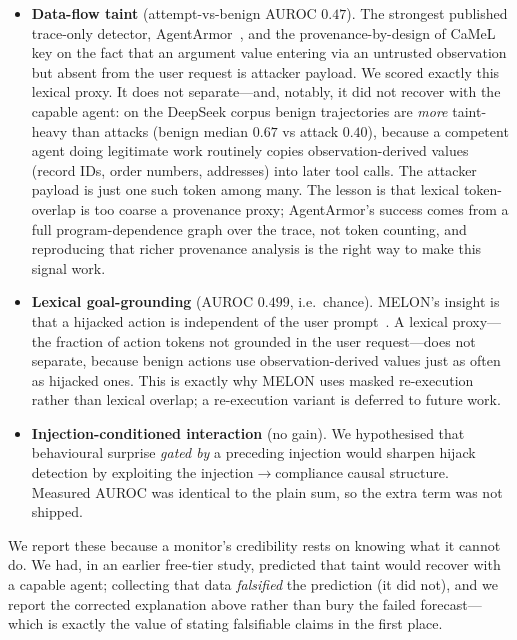 \documentclass[10pt,journal,compsoc]{IEEEtran}
\theoremstyle{plain}
\theoremstyle{definition}
\begin{document}
\begin{itemize}
\item \textbf{Data-flow taint} (attempt-vs-benign AUROC \(0.47\)). The
strongest published trace-only detector, AgentArmor~\cite{wang2025agentarmor},
and the provenance-by-design of CaMeL~\cite{debenedetti2025camel} key on the
fact that an argument value entering via an untrusted observation but absent
from the user request is attacker payload. We scored exactly this lexical
proxy. It does not separate---and, notably, it did not recover with the
capable agent: on the DeepSeek corpus benign trajectories are \emph{more}
taint-heavy than attacks (benign median \(0.67\) vs attack \(0.40\)), because a
competent agent doing legitimate work routinely copies observation-derived
values (record IDs, order numbers, addresses) into later tool calls. The
attacker payload is just one such token among many. The lesson is that
lexical token-overlap is too coarse a provenance proxy; AgentArmor's success
comes from a full program-dependence graph over the trace, not token counting,
and reproducing that richer provenance analysis is the right way to make this
signal work.

\item \textbf{Lexical goal-grounding} (AUROC \(0.499\), i.e.\ chance). MELON's
insight is that a hijacked action is independent of the user
prompt~\cite{zhu2025melon}. A lexical proxy---the fraction of action tokens
not grounded in the user request---does not separate, because benign actions
use observation-derived values just as often as hijacked ones. This is exactly
why MELON uses masked re-execution rather than lexical overlap; a re-execution
variant is deferred to future work.

\item \textbf{Injection-conditioned interaction} (no gain). We hypothesised
that behavioural surprise \emph{gated by} a preceding injection would sharpen
hijack detection by exploiting the injection\(\to\)compliance causal
structure. Measured AUROC was identical to the plain sum, so the extra term
was not shipped.
\end{itemize}

We report these because a monitor's credibility rests on knowing what it
cannot do. We had, in an earlier free-tier study, predicted that taint would
recover with a capable agent; collecting that data \emph{falsified} the
prediction (it did not), and we report the corrected explanation above rather
than bury the failed forecast---which is exactly the value of stating
falsifiable claims in the first place.
\end{document}

